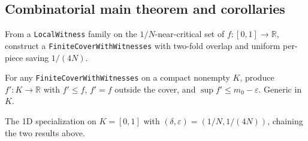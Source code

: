 \subsection{Combinatorial main theorem and corollaries}

\begin{theorem}
\label{thm:exists-refinement}
\leanok
{}
From a \texttt{LocalWitness} family on the
$1/N$-near-critical set of $f : [0,1] \to \mathbb R$,
construct a \texttt{FiniteCoverWithWitnesses} with two-fold
overlap and uniform per-piece saving $1/(4N)$.
\end{theorem}

\begin{theorem}
\label{thm:sup-reduction-of-cover}
\leanok
{}
For any \texttt{FiniteCoverWithWitnesses} on a compact nonempty
$K$, produce $f' : K \to \mathbb R$ with $f' \le f$,
$f' = f$ outside the cover, and
$\sup f' \le m_0 - \varepsilon$.  Generic in $K$.
\end{theorem}

\begin{theorem}
\label{thm:exists-sup-reduction}
\leanok
{}
The 1D specialization on $K = [0,1]$ with
$(\delta, \varepsilon) = (1/N, 1/(4N))$, chaining the two
results above.
\end{theorem}

